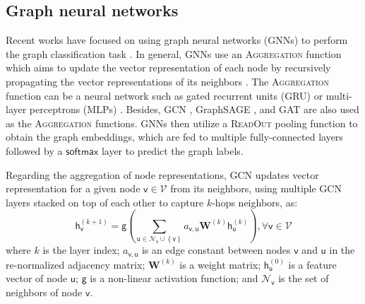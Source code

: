 \documentclass[twoside,leqno,twocolumn]{article}
\newcommand{\citep}{\cite}
\begin{document}
\subsection{Graph neural networks} Recent works have focused on using graph neural networks (GNNs) to perform the graph classification task \citep{scarselli2009graph,li2015gated,niepert2016learning,Gilmer2017,zhang2018end,Ying2018diffpool,verma2018graph,xu2019powerful}. 
In general, GNNs use an \textsc{Aggregation} function which aims to update the vector representation of each node by recursively propagating the vector representations of its neighbors \citep{scarselli2009graph,kipf2017semi,hamilton2017inductive,velickovic2018graph}.
The \textsc{Aggregation} function can be a neural network such as gated recurrent units (GRU) \citep{li2015gated} or multi-layer perceptrons (MLPs) \citep{xu2019powerful}.
Besides, GCN \citep{kipf2017semi}, GraphSAGE \citep{hamilton2017inductive}, and GAT \citep{velickovic2018graph} are also used as the \textsc{Aggregation} functions.
GNNs then utilize a \textsc{ReadOut} pooling function to obtain the graph embeddings, which are fed to multiple fully-connected layers followed by a $\mathsf{softmax}$ layer to predict the graph labels.


Regarding the aggregation of node representations, GCN \citep{kipf2017semi} updates vector representation for a given node $\mathsf{v} \in \mathcal{V}$ from its neighbors, using multiple GCN layers stacked on top of each other to capture $k$-hops neighbors, as:
\begin{equation}
\boldsymbol{\mathsf{h}}_{\mathsf{v}}^{(k+1)} = \mathsf{g}\left(\sum_{\mathsf{u} \in \mathcal{N}_\mathsf{v}\cup\left\{\mathsf{v}\right\}}a_{\mathsf{v},\mathsf{u}}\textbf{W}^{(k)}\boldsymbol{\mathsf{h}}_{\mathsf{u}}^{(k)}\right) , \forall \mathsf{v} \in \mathcal{V}
\label{equa:gcn2}
\end{equation}
where $k$ is the layer index; $a_{\mathsf{v},\mathsf{u}}$ is an edge constant between nodes $\mathsf{v}$ and $\mathsf{u}$ in the re-normalized adjacency matrix; $\textbf{W}^{(k)}$ is a weight matrix; $\boldsymbol{\mathsf{h}}_{\mathsf{u}}^{(0)}$ is a feature vector of node $\mathsf{u}$; $\mathsf{g}$ is a non-linear activation function; and $\mathcal{N}_\mathsf{v}$ is the set of neighbors of node $\mathsf{v}$.
\end{document}

